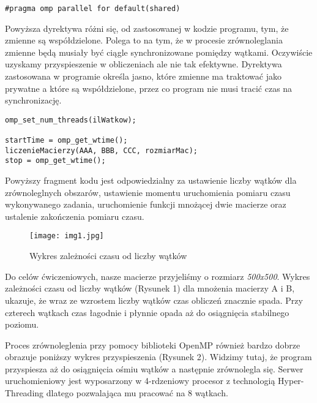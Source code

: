 \documentclass[a4paper,12pt]{article}
\begin{document}
\begin{lstlisting}
#pragma omp parallel for default(shared)
\end{lstlisting}
Powyższa dyrektywa różni się, od zastosowanej w kodzie programu, tym, że zmienne są współdzielone. Polega to na tym, że w procesie zrównoleglania zmienne będą musiały być ciągle synchronizowane pomiędzy wątkami. Oczywiście uzyskamy przyspieszenie w obliczeniach ale nie tak efektywne. Dyrektywa zastosowana w programie określa jasno, które zmienne ma traktować jako prywatne a które są współdzielone, przez co program nie musi tracić czas na synchronizację.

\begin{lstlisting}
omp_set_num_threads(ilWatkow); 			

startTime = omp_get_wtime(); 			
liczenieMacierzy(AAA, BBB, CCC, rozmiarMac);	
stop = omp_get_wtime(); 		
\end{lstlisting}

Powyższy fragment kodu jest odpowiedzialny za ustawienie liczby wątków dla zrównoleglnych obszarów, ustawienie momentu uruchomienia pomiaru czasu wykonywanego zadania, uruchomienie funkcji mnożącej dwie macierze oraz ustalenie zakończenia pomiaru czasu.

\begin{wrapfigure}{r}{0.5\textwidth}
	\vspace{-40pt}
	\begin{center}
		\texttt{[image: img1.jpg]}
	\end{center}
	\vspace{-20pt}
	\caption{Wykres zależności czasu od liczby wątków}
	\vspace{35pt}
\end{wrapfigure}

Do celów ćwiczeniowych, nasze macierze przyjeliśmy o rozmiarz \textit{500x500}. Wykres zależności czasu od liczby wątków (Rysunek 1) dla mnożenia macierzy A i B, ukazuje, że wraz ze wzrostem liczby wątków czas obliczeń znacznie spada. Przy czterech wątkach czas łagodnie i płynnie opada aż do osiągnięcia stabilnego poziomu. 

Proces zrównoleglenia przy pomocy biblioteki OpenMP również bardzo dobrze obrazuje poniższy wykres przyspieszenia (Rysunek 2). Widzimy tutaj, że program przyspiesza aż do osiągnięcia ośmiu wątków a następnie zrównolegla się. Serwer uruchomieniowy jest wyposarzony w 4-rdzeniowy procesor z technologią Hyper-Threading dlatego pozwalająca mu pracować na 8 wątkach.
\end{document}
